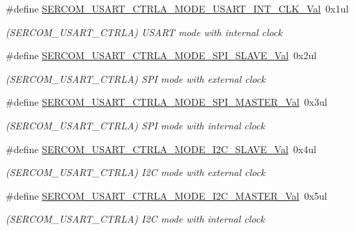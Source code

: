 \begin{DoxyCompactItemize}
\#define \mbox{\hyperlink{group___s_a_m_d21___s_e_r_c_o_m_gab094f5f023e5151cc90493afb57bcf9a}{S\+E\+R\+C\+O\+M\+\_\+\+U\+S\+A\+R\+T\+\_\+\+C\+T\+R\+L\+A\+\_\+\+M\+O\+D\+E\+\_\+\+U\+S\+A\+R\+T\+\_\+\+I\+N\+T\+\_\+\+C\+L\+K\+\_\+\+Val}}~0x1ul
\begin{DoxyCompactList}\small\item\em (S\+E\+R\+C\+O\+M\+\_\+\+U\+S\+A\+R\+T\+\_\+\+C\+T\+R\+LA) U\+S\+A\+RT mode with internal clock \end{DoxyCompactList}\item 
\#define \mbox{\hyperlink{group___s_a_m_d21___s_e_r_c_o_m_ga695f8c611a128fcad98db74eb2105430}{S\+E\+R\+C\+O\+M\+\_\+\+U\+S\+A\+R\+T\+\_\+\+C\+T\+R\+L\+A\+\_\+\+M\+O\+D\+E\+\_\+\+S\+P\+I\+\_\+\+S\+L\+A\+V\+E\+\_\+\+Val}}~0x2ul
\begin{DoxyCompactList}\small\item\em (S\+E\+R\+C\+O\+M\+\_\+\+U\+S\+A\+R\+T\+\_\+\+C\+T\+R\+LA) S\+PI mode with external clock \end{DoxyCompactList}\item 
\#define \mbox{\hyperlink{group___s_a_m_d21___s_e_r_c_o_m_gae0b992b3e822d2aaab69a27df027b8ef}{S\+E\+R\+C\+O\+M\+\_\+\+U\+S\+A\+R\+T\+\_\+\+C\+T\+R\+L\+A\+\_\+\+M\+O\+D\+E\+\_\+\+S\+P\+I\+\_\+\+M\+A\+S\+T\+E\+R\+\_\+\+Val}}~0x3ul
\begin{DoxyCompactList}\small\item\em (S\+E\+R\+C\+O\+M\+\_\+\+U\+S\+A\+R\+T\+\_\+\+C\+T\+R\+LA) S\+PI mode with internal clock \end{DoxyCompactList}\item 
\#define \mbox{\hyperlink{group___s_a_m_d21___s_e_r_c_o_m_ga099621515079b8fb12c776aed23ab9ee}{S\+E\+R\+C\+O\+M\+\_\+\+U\+S\+A\+R\+T\+\_\+\+C\+T\+R\+L\+A\+\_\+\+M\+O\+D\+E\+\_\+\+I2\+C\+\_\+\+S\+L\+A\+V\+E\+\_\+\+Val}}~0x4ul
\begin{DoxyCompactList}\small\item\em (S\+E\+R\+C\+O\+M\+\_\+\+U\+S\+A\+R\+T\+\_\+\+C\+T\+R\+LA) I2C mode with external clock \end{DoxyCompactList}\item 
\#define \mbox{\hyperlink{group___s_a_m_d21___s_e_r_c_o_m_ga677182063fa3149dc27130337e0f5301}{S\+E\+R\+C\+O\+M\+\_\+\+U\+S\+A\+R\+T\+\_\+\+C\+T\+R\+L\+A\+\_\+\+M\+O\+D\+E\+\_\+\+I2\+C\+\_\+\+M\+A\+S\+T\+E\+R\+\_\+\+Val}}~0x5ul
\begin{DoxyCompactList}\small\item\em (S\+E\+R\+C\+O\+M\+\_\+\+U\+S\+A\+R\+T\+\_\+\+C\+T\+R\+LA) I2C mode with internal clock \end{DoxyCompactList}\item 

\end{DoxyCompactItemize}
